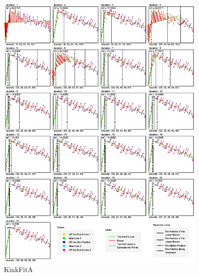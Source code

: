 \begin{figure}[h!]
  \centering
    \includegraphics[width=0.92\textwidth]{Chapter4/Figs/KinkFit_A.jpg}
    \caption{KinkFitA}\label{fig:KinkFitA}
\end{figure}

